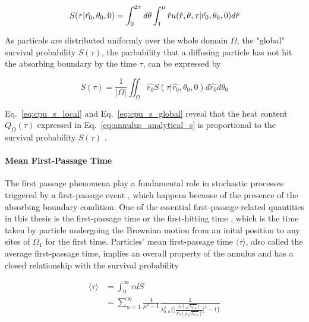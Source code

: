 \begin{equation}\label{eq:cpu_s_local}
  S(\tau | \hat{r_0}, \theta_0, 0) = \int_{0}^{2\pi} d\theta \int_{1}^{\mu} \hat r u(\hat r, \theta, \tau | \hat{r_0}, \theta_0, 0) d \hat r 
\end{equation}

As particals are distributed uniformly over the whole domain $\Omega$, the "global" survival probability $S(\tau)$, the parbability that a diffusing particle has not hit the absorbing boundary by the time $\tau$, can be expressed by

\begin{equation}\label{eq:cpu_s_global}
  S(\tau) = \frac{1}{|\Omega|}\iint_{\Omega} \hat{r_0} S(\tau | \hat{r_0}, \theta_0, 0) d \hat{r_0} d \theta_0
\end{equation}

Eq.~\ref{eq:cpu_s_local} and Eq.~\ref{eq:cpu_s_global} reveal that the heat content $Q_{\Omega}(\tau)$ expressed in Eq.~\ref{eq:annulus_analytical_s} is proportional to the survival probability $S(\tau)$ \cite{kalinay2011survival}. 


\paragraph{Mean First-Passage Time}

The first passage phenomena play a fundamental role in stochastic processes triggered by a first-passage event \cite{van1992stochastic},  which happens because of the presence of the absorbing boundary condition. One of the essential first-passage-related quantities in this thesis is the first-passage time or the first-hitting time \cite{redner2001guide}, which is the time taken by particle undergoing the Brownian motion from an inital position to any sites of $\Omega_1$ for the first time. Particles' mean first-passage time $\langle \tau \rangle$, also called the average first-passage time, implies an overall property of the annulus and has a closed relationship with the survival probability \cite{redner2001guide}

\begin{equation}\label{eq:mfpt}
  \begin{split}
    \langle \tau \rangle &= \int_{0}^{\infty} \tau dS\\
    &=\sum_{n=1}^{\infty} \frac{4}{\mu^2 - 1}
    \frac{1}{\lambda^2_{0,n}\bigg\{\bigg[\frac{J_0(\sqrt{\lambda_{0,n}})}{J'_0(\mu\sqrt{\lambda_{0,n}})}\bigg]^2
      -1\bigg\}}
  \end{split}
\end{equation}


